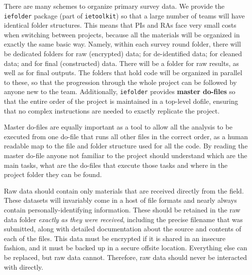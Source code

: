 There are many schemes to organize primary survey data.
We provide the \texttt{iefolder}
package (part of \texttt{ietoolkit}) so that
a large number of teams will have identical folder structures.
This means that PIs and RAs face very small costs
when switching between projects, because all the materials
will be organized in exactly the same basic way.
Namely, within each survey round folder,
there will be dedicated folders for raw (encrypted) data;
for de-identified data; for cleaned data; and for final (constructed) data.
There will be a folder for raw results, as well as for final outputs.
The folders that hold code will be organized in parallel to these,
so that the progression through the whole project can be followed
by anyone new to the team. Additionally, \texttt{iefolder}
provides \textbf{master do-files} so that the entire order
of the project is maintained in a top-level dofile,
ensuring that no complex instructions are needed
to exactly replicate the project.

Master do-files are equally important as a tool to allow all the analysis to
be executed from one do-file that runs all other files in the correct order,
as a human readable map to the file and folder structure used for all the
code. By reading the master do-file anyone not familiar to the project should
understand which are the main tasks, what are the do-files that execute those
tasks and where in the project folder they can be found.

Raw data should contain only materials that are received directly from the field.
These datasets will invariably come in a host of file formats
and nearly always contain personally-identifying information.
These should be retained in the raw data folder
\textit{exactly as they were received},
including the precise filename that was submitted,
along with detailed documentation about the source and contents
of each of the files. This data must be encrypted
if it is shared in an insecure fashion,
and it must be backed up in a secure offsite location.
Everything else can be replaced, but raw data cannot.
Therefore, raw data should never be interacted with directly.

